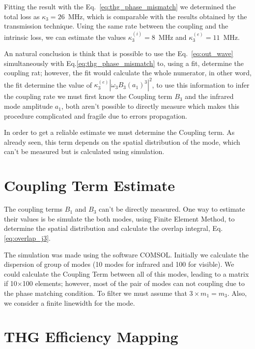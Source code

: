 Fitting the result with the Eq.~\ref{eq:thg_phase_mismatch} we determined the total loss as $\kappa_3 = 26$~MHz, which is comparable with the results obtained by the transmission technique. Using the same rate between the coupling and the intrinsic loss, we can estimate the values $\kappa_3^{(i)} = 8$~MHz and $\kappa_3^{(e)}=11$~MHz. 

An natural conclusion is think that is possible to use the Eq.~\ref{eq:out_wave} simultaneously with Eq.\ref{eq:thg_phase_mismatch} to, using a fit, determine the coupling rat; however, the fit would calculate the whole numerator, in other word, the fit determine the value of $\kappa_3^{(e)}|\omega_3 B_3 (a_1)^3|^2$, to use this information to infer the coupling rate we must first know the Coupling term $B_3$ and the infrared mode amplitude $a_1$, both aren't possible to directly measure which makes this procedure complicated and fragile due to errors propagation. 

In order to get a reliable estimate we must determine the Coupling term. As already seen, this term depends on the spatial distribution of the mode, which can't be measured but is calculated using simulation.

\section{Coupling Term Estimate}

The coupling terms $B_1$ and $B_3$ can't be directly measured. One way to estimate their values is be simulate the both modes, using Finite Element Method, to determine the spatial distribution and calculate the overlap integral, Eq.\ref{eq:overlap_j3}.

The simulation was made using the software COMSOL\regmark. Initially we calculate the dispersion of group of modes (10 modes for infrared and 100 for visible). We could calculate the Coupling Term between all of this modes, leading to a matrix if 10$\times$100 elements; however, most of the pair of modes can not coupling due to the phase matching condition. To filter we must assume that $3\times m_1 = m_3$. Also, we consider a finite linewidth for the mode. 



\section{THG Efficiency Mapping}
